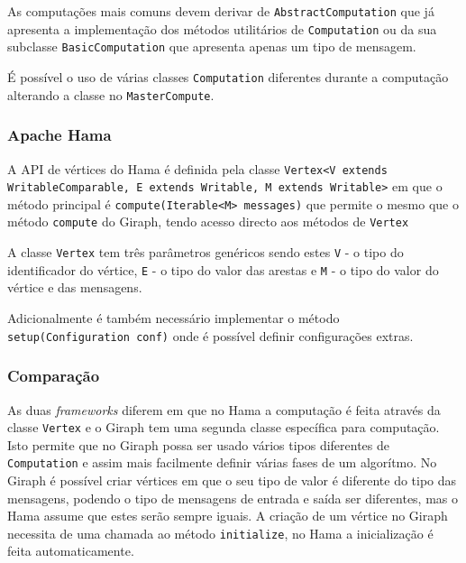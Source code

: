 As computações mais comuns devem derivar de \texttt{AbstractComputation} que já apresenta a implementação dos métodos utilitários de \texttt{Computation} ou da sua subclasse \texttt{BasicComputation} que apresenta apenas um tipo de mensagem.

É possível o uso de várias classes \texttt{Computation} diferentes durante a computação alterando a classe no \texttt{MasterCompute}.

\subsubsection*{Apache Hama}
A API de vértices do Hama é definida pela classe \texttt{Vertex<V extends WritableComparable, E extends Writable, M extends Writable>} em que o método principal é \texttt{compute(Iterable<M> messages)} que permite o mesmo que o método \texttt{compute} do Giraph, tendo acesso directo aos métodos de \texttt{Vertex}

A classe \texttt{Vertex} tem três parâmetros genéricos sendo estes \texttt{V} - o tipo do identificador do vértice, \texttt{E} - o tipo do valor das arestas e \texttt{M} - o tipo do valor do vértice e das mensagens.


Adicionalmente é também necessário implementar o método \texttt{setup(Configuration conf)} onde é possível definir configurações extras.
\subsubsection*{Comparação}


As duas \textit{frameworks} diferem em que no Hama a computação é feita através da classe \texttt{Vertex} e o Giraph tem uma segunda classe específica para computação. Isto permite que no Giraph possa ser usado vários tipos diferentes de \texttt{Computation} e assim mais facilmente definir várias fases de um algorítmo.
No Giraph é possível criar vértices em que o seu tipo de valor é diferente do tipo das mensagens, podendo o tipo de mensagens de entrada e saída ser diferentes, mas o Hama assume que estes serão sempre iguais. A criação de um vértice no Giraph necessita de uma chamada ao método \texttt{initialize}, no Hama a inicialização é feita automaticamente.